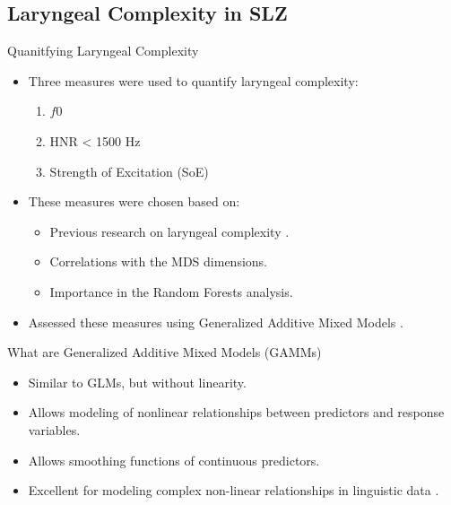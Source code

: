 \documentclass[professionalfonts]{beamer}
\begin{document}
\subsection{Laryngeal Complexity in SLZ}

\begin{frame}{Quanitfying Laryngeal Complexity}
  \begin{itemize}
    \item Three measures were used to quantify laryngeal complexity:
    \begin{enumerate}
      \item $f0$
      \item HNR < 1500 Hz
      \item Strength of Excitation (SoE)
    \end{enumerate}
    \item These measures were chosen based on:
    \begin{itemize}
      \item Previous research on laryngeal complexity \citep[e.g.,][]{dicanioCoarticulationToneGlottal2012}.
      \item Correlations with the MDS dimensions.
      \item Importance in the Random Forests analysis.
    \end{itemize}
    \item Assessed these measures using Generalized Additive Mixed Models \citep[GAMM;][]{hastieGeneralizedAdditiveModels1986,woodGeneralizedAdditiveModels2017}.
  \end{itemize}
\end{frame}

\begin{frame}{What are Generalized Additive Mixed Models (GAMMs)}
  \begin{itemize}
    \item Similar to GLMs, but without linearity.
    \item Allows modeling of nonlinear relationships between predictors and response variables.
    \item Allows smoothing functions of continuous predictors.
    \item Excellent for modeling complex non-linear relationships in linguistic data \citep[e.g.,][]{coetzeeProducingPerceivingSocially2022,wielingAnalyzingDynamicPhonetic2018}.
  \end{itemize}
\end{frame}
\end{document}
